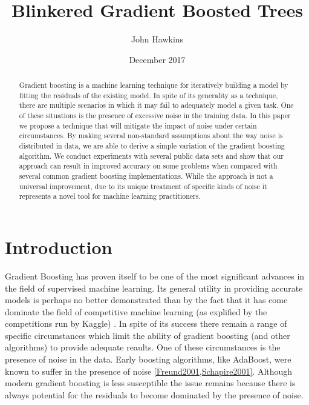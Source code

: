 \documentclass[11pt,twoside,a4paper]{article}
\begin{document}
\title{Blinkered Gradient Boosted Trees}
\author{John Hawkins}
\date{December 2017}
\maketitle

\begin{abstract}

Gradient boosting is a machine learning technique for iteratively building
a model by fitting the residuals of the existing model. 
In spite of its generality as a technique, there are multiple scenarios in which it may
fail to adequately model a given task. One of these situations is the presence of
excessive noise in the training data. In this paper we propose a technique that will
mitigate the impact of noise under certain circumstances.
By making several non-standard assumptions about the way noise is
distributed in data, we are able to derive a simple variation of
the gradient boosting algorithm.
We conduct experiments with several public data sets
and show that our approach can result in improved accuracy on some problems when compared with
several common gradient boosting implementations. While the approach is not a universal
improvement, due to its unique treatment of specific kinds of noise it
represents a novel tool for machine learning practitioners.

\end{abstract}

\section{Introduction}

Gradient Boosting has proven itself to be one of the most significant advances in
the field of supervised machine learning. Its general utility in providing accurate models
is perhaps no better demonstrated than by the fact that it has come dominate the field of 
competitive machine learning (as explified by the competitions run by Kaggle) \cite{kaggle}.
In spite of its success there remain a range of specific circumstances which limit the ability of
gradient boosting (and other algorithms) to provide adequate reaults. One of these
circumstances is the presence of noise in the data.
Early boosting algorithms, like AdaBoost, were known
to suffer in the presence of noise \ref{Freund2001,Schapire2001}. Although modern gradient boosting
is less susceptible the issue remains because there is always potential for the residuals to become
dominated by the presence of noise.  
\end{document}
